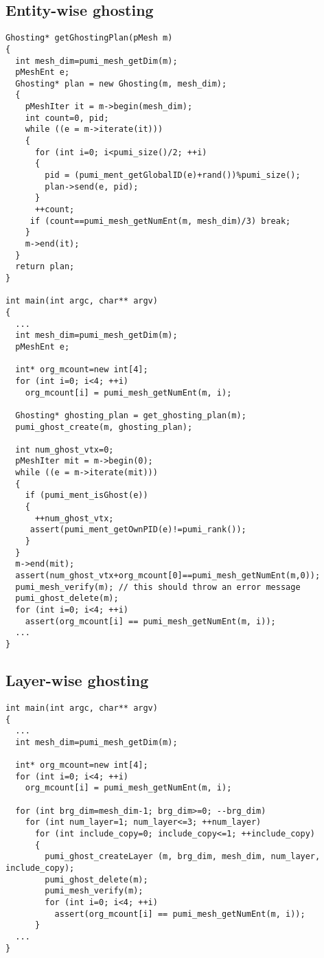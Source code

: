\subsection{Entity-wise ghosting}
\begin{small}
\begin{verbatim}
Ghosting* getGhostingPlan(pMesh m)
{
  int mesh_dim=pumi_mesh_getDim(m);
  pMeshEnt e;
  Ghosting* plan = new Ghosting(m, mesh_dim);
  {
    pMeshIter it = m->begin(mesh_dim);
    int count=0, pid;
    while ((e = m->iterate(it)))
    {
      for (int i=0; i<pumi_size()/2; ++i)
      {
        pid = (pumi_ment_getGlobalID(e)+rand())%pumi_size();
        plan->send(e, pid);
      }
      ++count; 
     if (count==pumi_mesh_getNumEnt(m, mesh_dim)/3) break;
    }
    m->end(it);
  }
  return plan;
}

int main(int argc, char** argv)
{
  ...
  int mesh_dim=pumi_mesh_getDim(m);
  pMeshEnt e;

  int* org_mcount=new int[4];
  for (int i=0; i<4; ++i)
    org_mcount[i] = pumi_mesh_getNumEnt(m, i);

  Ghosting* ghosting_plan = get_ghosting_plan(m);
  pumi_ghost_create(m, ghosting_plan);

  int num_ghost_vtx=0;
  pMeshIter mit = m->begin(0);
  while ((e = m->iterate(mit)))
  {
    if (pumi_ment_isGhost(e))
    {
      ++num_ghost_vtx;
     assert(pumi_ment_getOwnPID(e)!=pumi_rank());
    }
  }   
  m->end(mit);
  assert(num_ghost_vtx+org_mcount[0]==pumi_mesh_getNumEnt(m,0));
  pumi_mesh_verify(m); // this should throw an error message
  pumi_ghost_delete(m);
  for (int i=0; i<4; ++i)
    assert(org_mcount[i] == pumi_mesh_getNumEnt(m, i));
  ...
}
\end{verbatim}
\end{small}

\subsection{ Layer-wise ghosting}
\begin{small}
\begin{verbatim}
int main(int argc, char** argv)
{
  ...
  int mesh_dim=pumi_mesh_getDim(m);

  int* org_mcount=new int[4];
  for (int i=0; i<4; ++i)
    org_mcount[i] = pumi_mesh_getNumEnt(m, i);

  for (int brg_dim=mesh_dim-1; brg_dim>=0; --brg_dim)
    for (int num_layer=1; num_layer<=3; ++num_layer)
      for (int include_copy=0; include_copy<=1; ++include_copy)
      {
        pumi_ghost_createLayer (m, brg_dim, mesh_dim, num_layer, include_copy);
        pumi_ghost_delete(m);
        pumi_mesh_verify(m);
        for (int i=0; i<4; ++i)
          assert(org_mcount[i] == pumi_mesh_getNumEnt(m, i));
      }
  ...
}
\end{verbatim}
\end{small}

